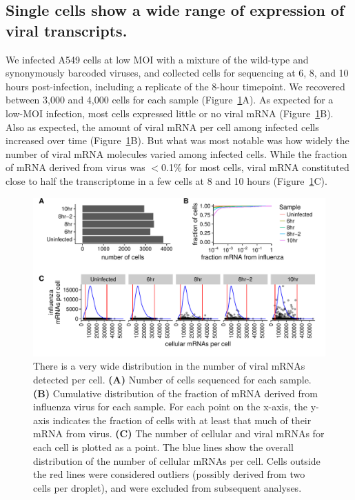 \documentclass[9pt,lineno]{elife}
\begin{document}
\subsection{Single cells show a wide range of expression of viral transcripts.}
We infected A549 cells at low MOI with a mixture of the wild-type and synonymously barcoded viruses, and collected cells for sequencing at 6, 8, and 10 hours post-infection, including a replicate of the 8-hour timepoint.
We recovered between 3,000 and 4,000 cells for each sample (Figure~\ref{fig:cells}A). 
As expected for a low-MOI infection, most cells expressed little or no viral mRNA (Figure~\ref{fig:cells}B).
Also as expected, the amount of viral mRNA per cell among infected cells increased over time (Figure~\ref{fig:cells}B).
But what was most notable was how widely the number of viral mRNA molecules varied among infected cells.
While the fraction of mRNA derived from virus was $<$0.1\% for most cells, viral mRNA constituted close to half the transcriptome in a few cells at 8 and 10 hours (Figure~\ref{fig:cells}C).

\begin{figure}
\centerline{\includegraphics[width=0.9\linewidth]{figures/p_cell_mRNA_summary.pdf}}
\caption{\label{fig:cells}
There is a very wide distribution in the number of viral mRNAs detected per cell.
{\bf (A)} 
Number of cells sequenced for each sample.
{\bf (B)} 
Cumulative distribution of the fraction of mRNA derived from influenza virus for each sample.
For each point on the x-axis, the y-axis indicates the fraction of cells with at least that much of their mRNA from virus.
{\bf (C)} 
The number of cellular and viral mRNAs for each cell is plotted as a point.
The blue lines show the overall distribution of the number of cellular mRNAs per cell.
Cells outside the red lines were considered outliers (possibly derived from two cells per droplet), and were excluded from subsequent analyses.
}
\end{figure}
\end{document}
